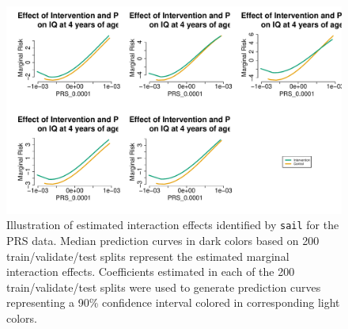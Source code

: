 \documentclass[12pt,letter]{article}\usepackage[]{graphicx}\usepackage[]{color}
\newenvironment{knitrout}{}{} %
\begin{document}
\begin{knitrout}\scriptsize
{}\color{fgcolor}\begin{figure}[H]

{\centering \includegraphics[width=1\linewidth]{figure/PRS-intervention-interaction-others-1} 

}

\caption[Illustration of estimated interaction effects identified by \texttt{sail} for the PRS data]{Illustration of estimated interaction effects identified by \texttt{sail} for the PRS data. Median prediction curves in dark colors based on 200 train/validate/test splits represent the estimated marginal interaction effects. Coefficients estimated in each of the 200 train/validate/test splits were used to generate prediction curves representing a 90\% confidence interval colored in corresponding light colors.}\label{fig:PRS-intervention-interaction-others}
\end{figure}


\end{knitrout}
\end{document}
